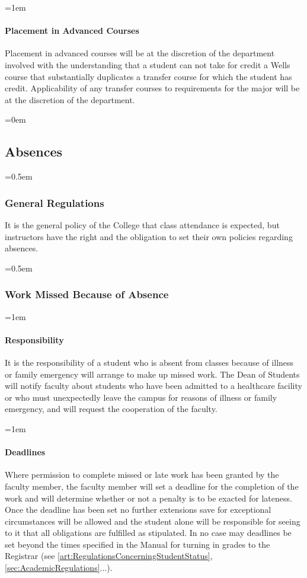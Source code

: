 \documentclass{manual}
\newcommand{\modified}[1]{}
\newcommand{\oldbreak}[1]{}
\let\oldsubsection\subsection
\renewcommand\subsection{\leftskip=0em\oldsubsection}
\let\oldsubsubsection\subsubsection
\renewcommand\subsubsection{\leftskip=0.5em\oldsubsubsection}
\let\oldparagraph\paragraph
\renewcommand\paragraph{\leftskip=1em\oldparagraph}
\begin{document}
\paragraph{Placement in Advanced Courses}
Placement in advanced courses will be at the discretion of the department involved with the understanding that a student can not take for credit a Wells course that substantially duplicates a transfer course for which the student has credit. Applicability of any transfer courses to requirements for the major will be at the discretion of the department.

\oldbreak{VIII - 1}

\subsection{Absences}

\subsubsection{General Regulations}\modified{5/14/02}

It is the general policy of the College that class attendance is expected, but instructors have the right and the obligation to set their own policies regarding absences.

\subsubsection{Work Missed Because of Absence}

\paragraph{Responsibility}
It is the responsibility of a student who is absent from classes because of illness or family emergency will arrange to make up missed work. The Dean of Students will notify faculty about students who have been admitted to a healthcare facility or who must unexpectedly leave the campus for reasons of illness or family emergency, and will request the cooperation of the faculty.

\paragraph{Deadlines}
Where permission to complete missed or late work has been granted by the faculty member, the faculty member will set a deadline for the completion of the work and will determine whether or not a penalty is to be exacted for lateness. Once the deadline has been set no further extensions save for exceptional circumstances will be allowed and the student alone will be responsible for seeing to it that all obligations are fulfilled as stipulated. In no case may deadlines be set beyond the times specified in the Manual for turning in grades to the Registrar (see \cref{art:RegulationsConcerningStudentStatus}, \cref{sec:AcademicRegulations}...).
\end{document}
